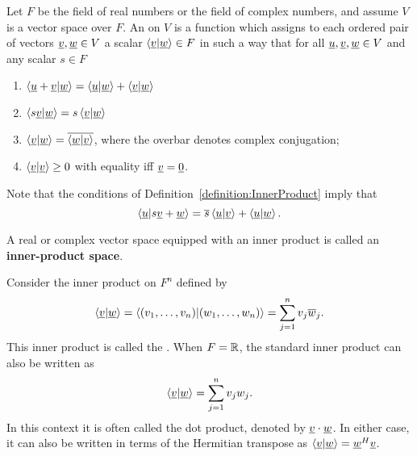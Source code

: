 \begin{definition} \label{definition:InnerProduct}
Let $F$ be the field of real numbers or the field of complex numbers, and assume $V$ is a vector space over $F$.
An  on $V$ is a function which assigns to each ordered pair of vectors $\underline{v}, \underline{w} \in V$ a scalar $\left\langle \underline{v} | \underline{w} \right\rangle \in F$ in such a way that for all $\underline{u}, \underline{v}, \underline{w} \in V$ and any scalar $s \in F$
\begin{enumerate}
\item $\left\langle \underline{u} + \underline{v} | \underline{w} \right\rangle
= \left\langle \underline{u} | \underline{w} \right\rangle
+ \left\langle \underline{v} | \underline{w} \right\rangle$
\item $\left\langle s \underline{v} | \underline{w} \right\rangle
= s \left\langle \underline{v} | \underline{w} \right\rangle$
\item $\left\langle \underline{v} | \underline{w} \right\rangle
= \overline{ \left\langle \underline{w} | \underline{v} \right\rangle }$, where the overbar denotes complex conjugation;
\item $\left\langle \underline{v} | \underline{v} \right\rangle \geq 0$ with equality iff $\underline{v} = \underline{0}$.
\end{enumerate}
\end{definition}

Note that the conditions of Definition~\ref{definition:InnerProduct} imply that
\begin{equation*}
\left\langle \underline{u} | s \underline{v} + \underline{w} \right\rangle
= \overline{s} \left\langle \underline{u} | \underline{v} \right\rangle
+ \left\langle \underline{u} | \underline{w} \right\rangle .
\end{equation*}

\begin{definition}
A real or complex vector space equipped with an inner product is called an \textbf{inner-product space}.
\end{definition}

\begin{example} \label{example:StandardInnerProduct}
Consider the inner product on $F^n$ defined by
\begin{equation*}
\left\langle \underline{v} | \underline{w} \right\rangle
= \left\langle (v_1, \ldots, v_n) | (w_1, \ldots, w_n) \right\rangle
= \sum_{j=1}^n v_j \overline{w}_j.
\end{equation*}
This inner product is called the .
When $F = \mathbb{R}$, the standard inner product can also be written as
\begin{equation*}
\left\langle \underline{v} | \underline{w} \right\rangle
= \sum_{j=1}^n v_j w_j.
\end{equation*}
In this context it is often called the dot product, denoted by $\underline{v} \cdot \underline{w}$.
In either case, it can also be written in terms of the Hermitian transpose as $ \left\langle \underline{v} | \underline{w} \right\rangle = \underline{w}^H \underline{v} $.

\end{example}

